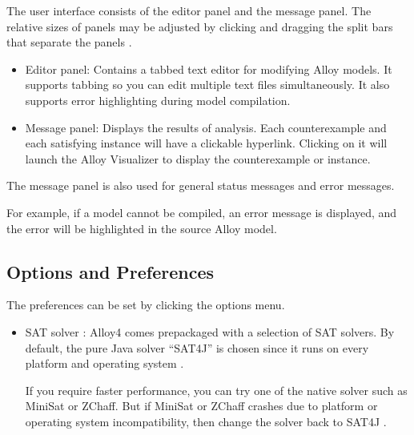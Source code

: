 \documentclass[a4paper,12pt]{report}
\begin{document}
\begin{onehalfspacing}
The user interface consists of the editor panel and the message panel. The relative sizes of panels may be adjusted by clicking and dragging the split bars that separate the panels \cite{DanielJackson2004}.
\begin{itemize}
\item 	Editor panel: Contains a tabbed text editor for modifying Alloy models. It supports tabbing so you can edit multiple text files simultaneously. It also supports error highlighting during model compilation.
\item 	Message panel: Displays the results of analysis. Each counterexample and each satisfying instance will have a clickable hyperlink. Clicking on it will launch the Alloy Visualizer to display the counterexample or instance.
\end{itemize}
The message panel is also used for general status messages and error messages.

For example, if a model cannot be compiled, an error message is displayed, and the error will be highlighted in the source Alloy model.

\subsection{Options and Preferences}
\label{Options & Preference}

The preferences can be set by clicking the options menu.
\begin{itemize}
\item SAT solver : Alloy4 comes prepackaged with a selection of SAT solvers. By default, the pure Java solver ``SAT4J” is chosen since it runs on every platform and operating system \cite{DanielJackson2004}.

If you require faster performance, you can try one of the native solver such as MiniSat or ZChaff. But if MiniSat or ZChaff crashes due to platform or operating system incompatibility, then change the solver back to SAT4J \cite{DanielJackson2004}.


\end{itemize}
\end{onehalfspacing}
\end{document}
